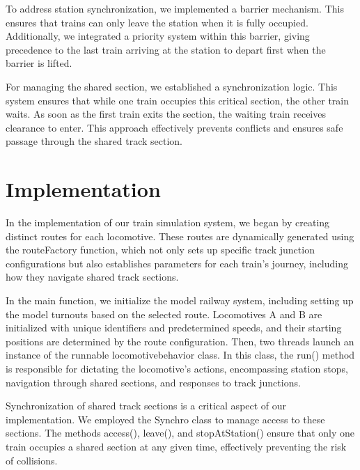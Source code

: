 \documentclass{article}
\begin{document}
    To address station synchronization, we implemented a barrier mechanism. This ensures that trains can only leave the station when it is fully occupied. Additionally, we integrated a priority system within this barrier, giving precedence to the last train arriving at the station to depart first when the barrier is lifted.

    For managing the shared section, we established a synchronization logic. This system ensures that while one train occupies this critical section, the other train waits. As soon as the first train exits the section, the waiting train receives clearance to enter. This approach effectively prevents conflicts and ensures safe passage through the shared track section.

    \section{Implementation}

    In the implementation of our train simulation system, we began by creating distinct routes for each locomotive. These routes are dynamically generated using the routeFactory function, which not only sets up specific track junction configurations but also establishes parameters for each train's journey, including how they navigate shared track sections.

    In the main function, we initialize the model railway system, including setting up the model turnouts based on the selected route. Locomotives A and B are initialized with unique identifiers and predetermined speeds, and their starting positions are determined by the route configuration. Then, two threads launch an instance of the runnable locomotivebehavior class. In this class, the run() method is responsible for dictating the locomotive's actions, encompassing station stops, navigation through shared sections, and responses to track junctions.

    Synchronization of shared track sections is a critical aspect of our implementation. We employed the Synchro class to manage access to these sections. The methods access(), leave(), and stopAtStation() ensure that only one train occupies a shared section at any given time, effectively preventing the risk of collisions.
\end{document}
